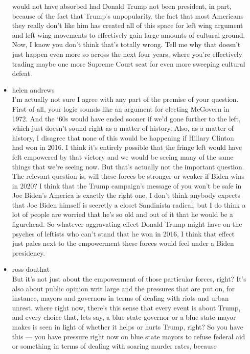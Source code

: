 \begin{itemize}
  would not have absorbed had Donald Trump not been president, in part,
  because of the fact that Trump's unpopularity, the fact that most
  Americans they really don't like him has created all of this space for
  left wing argument and left wing movements to effectively gain large
  amounts of cultural ground. Now, I know you don't think that's totally
  wrong. Tell me why that doesn't just happen even more so across the
  next four years, where you're effectively trading maybe one more
  Supreme Court seat for even more sweeping cultural defeat.
\item
  helen andrews\\
  I'm actually not sure I agree with any part of the premise of your
  question. First of all, your logic sounds like an argument for
  electing McGovern in 1972. And the `60s would have ended sooner if
  we'd gone further to the left, which just doesn't sound right as a
  matter of history. Also, as a matter of history, I disagree that none
  of this would be happening if Hillary Clinton had won in 2016. I think
  it's entirely possible that the fringe left would have felt empowered
  by that victory and we would be seeing many of the same things that
  we're seeing now. But that's actually not the important question. The
  relevant question is, will these forces be stronger or weaker if Biden
  wins in 2020? I think that the Trump campaign's message of you won't
  be safe in Joe Biden's America is exactly the right one. I don't think
  anybody expects that Joe Biden himself is secretly a closet Sandinista
  radical, but I do think a lot of people are worried that he's so old
  and out of it that he would be a figurehead. So whatever aggravating
  effect Donald Trump might have on the psyches of leftists who can't
  stand that he won in 2016, I think that effect just pales next to the
  empowerment these forces would feel under a Biden presidency.
\item
  ross douthat\\
  But it's not just about the empowerment of those particular forces,
  right? It's also about public opinion writ large and the pressures
  that are put on, for instance, mayors and governors in terms of
  dealing with riots and urban unrest. where right now, there's this
  sense that every event is about Trump, and every choice that, lets
  say, a blue state governor or a blue state mayor makes is seen in
  light of whether it helps or hurts Trump, right? So you have this ---
  you have pressure right now on blue state mayors to refuse federal aid
  or something in terms of dealing with soaring murder rates, because

\end{itemize}
